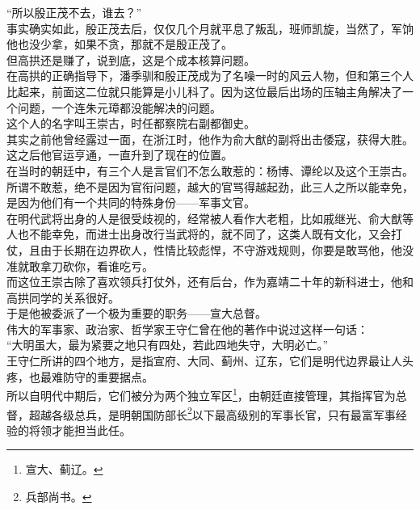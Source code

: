 \begin{multicols}{\theparacolNo}
“所以殷正茂不去，谁去？”\\

事实确实如此，殷正茂去后，仅仅几个月就平息了叛乱，班师凯旋，当然了，军饷他也没少拿，如果不贪，那就不是殷正茂了。\\

但高拱还是赚了，说到底，这是个成本核算问题。\\

在高拱的正确指导下，潘季驯和殷正茂成为了名噪一时的风云人物，但和第三个人比起来，前面这二位就只能算是小儿科了。因为这位最后出场的压轴主角解决了一个问题，一个连朱元璋都没能解决的问题。\\

这个人的名字叫王崇古，时任都察院右副都御史。\\

其实之前他曾经露过一面，在浙江时，他作为俞大猷的副将出击倭寇，获得大胜。这之后他官运亨通，一直升到了现在的位置。\\

在当时的朝廷中，有三个人是言官们不怎么敢惹的：杨博、谭纶以及这个王崇古。\\

所谓不敢惹，绝不是因为官衔问题，越大的官骂得越起劲，此三人之所以能幸免，是因为他们有一个共同的特殊身份——军事文官。\\

在明代武将出身的人是很受歧视的，经常被人看作大老粗，比如戚继光、俞大猷等人也不能幸免，而进士出身改行当武将的，就不同了，这类人既有文化，又会打仗，且由于长期在边界砍人，性情比较彪悍，不守游戏规则，你要是敢骂他，他没准就敢拿刀砍你，看谁吃亏。\\

而这位王崇古除了喜欢领兵打仗外，还有后台，作为嘉靖二十年的新科进士，他和高拱同学的关系很好。\\

于是他被委派了一个极为重要的职务——宣大总督。\\

伟大的军事家、政治家、哲学家王守仁曾在他的著作中说过这样一句话：\\

“大明虽大，最为紧要之地只有四处，若此四地失守，大明必亡。”\\

王守仁所讲的四个地方，是指宣府、大同、蓟州、辽东，它们是明代边界最让人头疼，也最难防守的重要据点。\\

所以自明代中期后，它们被分为两个独立军区\footnote{宣大、蓟辽。}，由朝廷直接管理，其指挥官为总督，超越各级总兵，是明朝国防部长\footnote{兵部尚书。}以下最高级别的军事长官，只有最富军事经验的将领才能担当此任。\\


\end{multicols}
